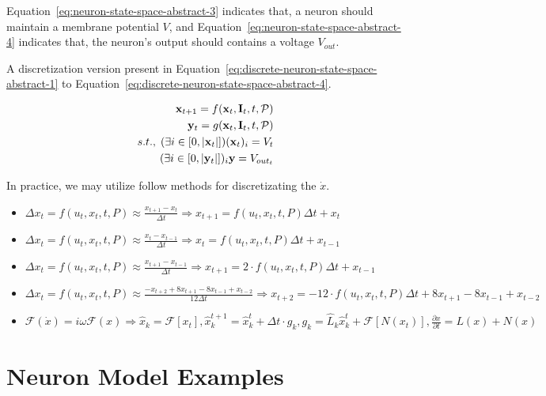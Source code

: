 Equation~\ref{eq:neuron-state-space-abstract-3} indicates that, a neuron should maintain a membrane potential $V$, 
and Equation~\ref{eq:neuron-state-space-abstract-4} indicates that, the neuron's output should contains a 
voltage $V_{out}$.

A discretization version present in Equation~\ref{eq:discrete-neuron-state-space-abstract-1} to 
Equation~\ref{eq:discrete-neuron-state-space-abstract-4}.

\begin{align}
    {\bold x}_{t + 1} = f(\bold x_t, \bold I_t, t, \mathcal P) \label{eq:discrete-neuron-state-space-abstract-1}  \\
    \bold y_t = g(\bold x_t, \bold I_t, t, \mathcal P) \label{eq:discrete-neuron-state-space-abstract-2} \\
    s.t.,\; (\exists i \in [0, |\bold x_t|])(\bold x_{t})_{i} = V_t \label{eq:discrete-neuron-state-space-abstract-3} \\
            (\exists i \in [0, |\bold y_t|])_i\bold y = V_{out_t} \label{eq:discrete-neuron-state-space-abstract-4}
\end{align}

In practice, we may utilize follow methods for discretizating the $\dot x$.
\begin{itemize}
    \item $\Delta x_t = f(u_t, x_t, t, P)\approx \frac{x_{t+1} - x_t}{\Delta t} \Rightarrow x_{t + 1} = f(u_t, x_t, t, P)\Delta t + x_t$
    \item $\Delta x_t = f(u_t, x_t, t, P)\approx \frac{x_{t} - x_{t - 1}}{\Delta t} \Rightarrow x_{t} = f(u_t, x_t, t, P)\Delta t + x_{t-1}$
    \item $\Delta x_t = f(u_t, x_t, t, P)\approx \frac{x_{t + 1} - x_{t - 1}}{\Delta t} \Rightarrow x_{t + 1} = 2\cdot f(u_t, x_t, t, P)\Delta t + x_{t - 1}$
    \item $\Delta x_t = f(u_t, x_t, t, P)\approx \frac{-x_{t + 2} + 8x_{t + 1} - 8x_{t-1}+x_{t-2}}{12\Delta t} \Rightarrow x_{t + 2} = -12\cdot f(u_t, x_t, t, P)\Delta t + 8x_{t + 1} - 8x_{t-1} + x_{t-2}$
    \item $\mathcal F(\dot x)=i\omega \mathcal F(x)\Rightarrow \hat x_k = \mathcal F[x_t],\hat x_{k}^{t+1}=\hat x_k^t +\Delta t\cdot g_k, g_k = \hat L_k\hat x_k^t +\mathcal F[N(x_t)], \frac{\partial x}{\partial t}=L(x) + N(x)$
\end{itemize}



\section{Neuron Model Examples}
